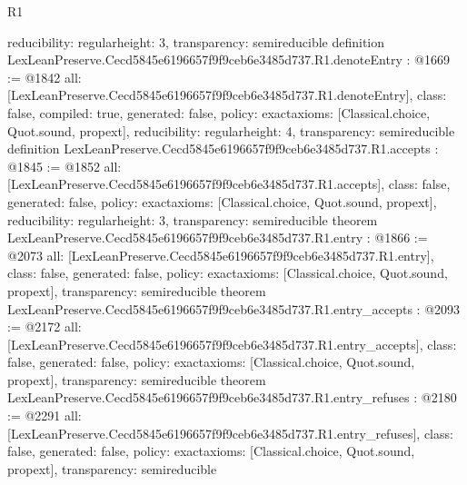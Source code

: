 \begin{lexlean}{R1}
\begin{coremodule}
{  reducibility: regular{height: 3},
  transparency: semireducible
}
definition LexLeanPreserve.Cecd5845e6196657f9f9ceb6e3485d737.R1.denoteEntry : @1669 := @1842 {
  all: [LexLeanPreserve.Cecd5845e6196657f9f9ceb6e3485d737.R1.denoteEntry],
  class: false,
  compiled: true,
  generated: false,
  policy: exact{axioms: [Classical.choice, Quot.sound, propext]},
  reducibility: regular{height: 4},
  transparency: semireducible
}
definition LexLeanPreserve.Cecd5845e6196657f9f9ceb6e3485d737.R1.accepts : @1845 := @1852 {
  all: [LexLeanPreserve.Cecd5845e6196657f9f9ceb6e3485d737.R1.accepts],
  class: false,
  generated: false,
  policy: exact{axioms: [Classical.choice, Quot.sound, propext]},
  reducibility: regular{height: 3},
  transparency: semireducible
}
theorem LexLeanPreserve.Cecd5845e6196657f9f9ceb6e3485d737.R1.entry : @1866 := @2073 {
  all: [LexLeanPreserve.Cecd5845e6196657f9f9ceb6e3485d737.R1.entry],
  class: false,
  generated: false,
  policy: exact{axioms: [Classical.choice, Quot.sound, propext]},
  transparency: semireducible
}
theorem LexLeanPreserve.Cecd5845e6196657f9f9ceb6e3485d737.R1.entry_accepts : @2093 := @2172 {
  all: [LexLeanPreserve.Cecd5845e6196657f9f9ceb6e3485d737.R1.entry_accepts],
  class: false,
  generated: false,
  policy: exact{axioms: [Classical.choice, Quot.sound, propext]},
  transparency: semireducible
}
theorem LexLeanPreserve.Cecd5845e6196657f9f9ceb6e3485d737.R1.entry_refuses : @2180 := @2291 {
  all: [LexLeanPreserve.Cecd5845e6196657f9f9ceb6e3485d737.R1.entry_refuses],
  class: false,
  generated: false,
  policy: exact{axioms: [Classical.choice, Quot.sound, propext]},
  transparency: semireducible
}


\end{coremodule}
\end{lexlean}
